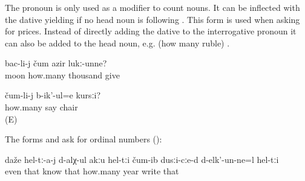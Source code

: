 \subsubsection{ }
\label{sssec:cum how many}

The pronoun   is only used as a modifier to count nouns. It can be inflected with the dative yielding  if no head noun is following . This form is used when asking for prices. Instead of directly adding the dative to the interrogative pronoun it can also be added to the head noun, e.g.  (how many ruble) .
%
\begin{exe}
	\ex	\label{ex:How many thousand (of rubles) does (the government) give per month (as child allowance)?}
	\gll	bac-li-j	čum	azir	lukː-unne?\\
		moon	how.many	thousand	give\\
	\glt	{}

	\ex	\label{ex:How much does the chair cost?}
	\gll	čum-li-j	b-ik'-ul=e	kursːi?\\
		how.many	say	chair\\
	\glt	{} (E)
\end{exe}

The forms  and  ask for ordinal numbers ():
%
\begin{exe}
	\ex	\label{ex:Even they do not remember in which year (the pictures) were drawn}
	\gll	daže	hel-tː-a-j d-alχ-ul akːu	hel-tːi	čum-ib	dusːi-cːe-d d-elk'-un-ne=l	hel-tːi\\
		even	that	know		that		how.many	year	write	that\\
	\glt	{}
\end{exe}



